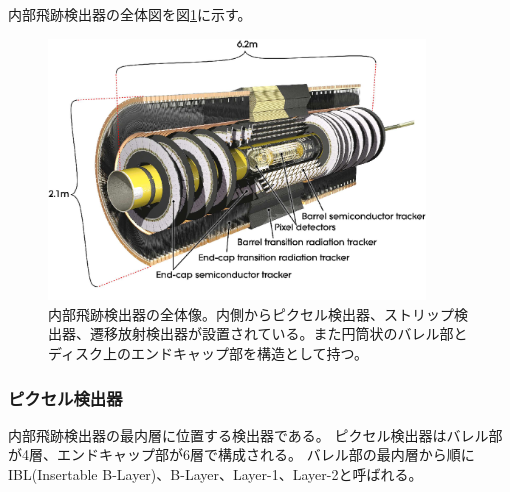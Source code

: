 内部飛跡検出器の全体図を図\ref{inner_detector}に示す。

\begin{figure}[bpt]\centering
\includegraphics[width=10cm]{./inner_detector.png}
\caption[内部飛跡検出器の全体像]{内部飛跡検出器の全体像\cite{1-2}。内側からピクセル検出器、ストリップ検出器、遷移放射検出器が設置されている。また円筒状のバレル部とディスク上のエンドキャップ部を構造として持つ。}
\label{inner_detector}
\end{figure}


%

\subsubsection{ピクセル検出器}

内部飛跡検出器の最内層に位置する検出器である。
ピクセル検出器はバレル部が4層、エンドキャップ部が6層で構成される。
バレル部の最内層から順にIBL(Insertable B-Layer)、B-Layer、Layer-1、Layer-2と呼ばれる。

